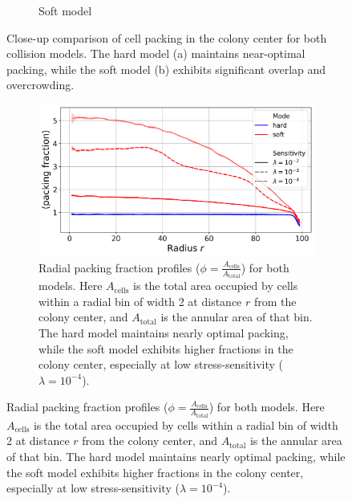 \documentclass[conference]{IEEEtran}
\begin{document}
\begin{figure}[H]
\begin{subfigure}[b]{0.49\columnwidth}
        \caption{Soft model}
    \end{subfigure}
    \caption{Close-up comparison of cell packing in the colony center for both collision models. The hard model (a) maintains near-optimal packing, while the soft model (b) exhibits significant overlap and overcrowding.}
    \label{fig:dense_packing_comparison}
\end{figure}

\begin{figure}[H]
    \centering
    \begin{subfigure}[b]{\linewidth}
        \centering
        \includegraphics[width=\linewidth]{figures/comparison_plots/combined_radial_packing_fraction.png}
        \caption{Radial packing fraction profiles ($\phi = \frac{A_{\text{cells}}}{A_{\text{total}}}$) for both models. Here $A_{\text{cells}}$ is the total area occupied by cells within a radial bin of width 2 at distance $r$ from the colony center, and $A_{\text{total}}$ is the annular area of that bin. The hard model maintains nearly optimal packing, while the soft model exhibits higher fractions in the colony center, especially at low stress-sensitivity ($\lambda = 10^{-4}$).}
        \label{fig:radial_distribution_packing_fraction}
    \end{subfigure}


\end{figure}
\end{document}
